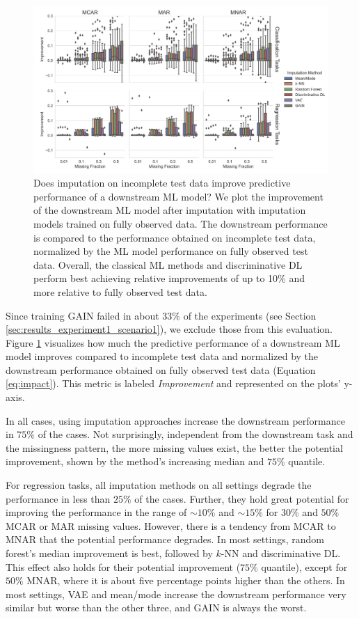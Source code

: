 \documentclass[utf8]{frontiersSCNS} %
\begin{document}
\begin{figure}\centering
	\includegraphics[width=1\columnwidth]{fully_observed_downstream_boxplot}
	\caption{Does imputation on incomplete test data improve predictive performance of a downstream ML model? We plot the improvement of the downstream ML model after imputation with imputation models trained on fully observed data. The downstream performance is compared to the performance obtained on incomplete test data, normalized by the ML model performance on fully observed test data. Overall, the classical ML methods and discriminative DL perform best achieving relative improvements of up to 10\% and more relative to fully observed test data.
	}
	\label{fig:fully_observed_downstream_boxplot}
\end{figure}

Since training GAIN failed in about $33\%$ of the experiments (see Section \ref{sec:results_experiment1_scenario1}), we exclude those from this evaluation. Figure \ref{fig:fully_observed_downstream_boxplot} visualizes how much the predictive performance of a downstream ML model improves compared to incomplete test data and normalized by the downstream performance obtained on fully observed test data (Equation \ref{eq:impact}). This metric is labeled \textit{Improvement} and represented on the plots' y-axis.

In all cases, using imputation approaches increase the downstream performance in $75\%$ of the cases. Not surprisingly, independent from the downstream task and the missingness pattern, the more missing values exist, the better the potential improvement, shown by the method's increasing median and $75\%$ quantile.

For regression tasks, all imputation methods on all settings degrade the performance in less than $25\%$ of the cases. Further, they hold great potential for improving the performance in the range of $\sim10\%$ and $\sim15\%$ for $30\%$ and $50\%$ MCAR or MAR missing values. However, there is a tendency from MCAR to MNAR that the potential performance degrades. In most settings, random forest's median improvement is best, followed by $k$-NN and discriminative DL. This effect also holds for their potential improvement ($75\%$ quantile), except for $50\%$ MNAR, where it is about five percentage points higher than the others. In most settings, VAE and mean/mode increase the downstream performance very similar but worse than the other three, and GAIN is always the worst.
\end{document}
